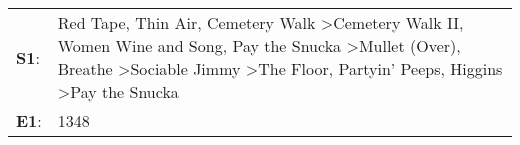 \begin{supertabular}{p{0.03\textwidth}p{0.92\textwidth}}
 \textbf{S1}:  &  Red Tape\textsuperscript{}, \enspace Thin Air\textsuperscript{}, \enspace Cemetery Walk\textsuperscript{} \textgreater \enspace Cemetery Walk II\textsuperscript{}, \enspace Women Wine and Song\textsuperscript{}, \enspace Pay the Snucka\textsuperscript{} \textgreater \enspace Mullet (Over)\textsuperscript{}, \enspace Breathe\textsuperscript{} \textgreater \enspace Sociable Jimmy\textsuperscript{} \textgreater \enspace The Floor\textsuperscript{}, \enspace Partyin' Peeps\textsuperscript{}, \enspace Higgins\textsuperscript{} \textgreater \enspace Pay the Snucka\textsuperscript{}  \enspace  \\
 \textbf{E1}:  &                                                                                                                                                                                                                                                                                                                                                                                                                                                                                                                                                                                  1348\textsuperscript{}  \enspace  \\
\end{supertabular}
